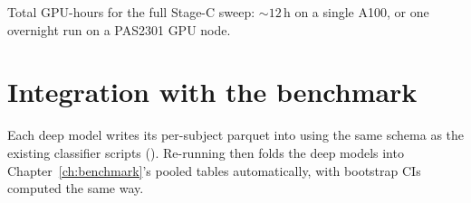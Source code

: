 \noindent
Total GPU-hours for the full Stage-C sweep: $\sim 12$\,h on a single
A100, or one overnight run on a PAS2301 GPU node.

\section{Integration with the benchmark}

Each deep model writes its per-subject parquet into
 using the same
schema as the existing classifier scripts
(). Re-running
 then folds the deep models
into Chapter~\ref{ch:benchmark}'s pooled tables automatically, with
bootstrap CIs computed the same way.
